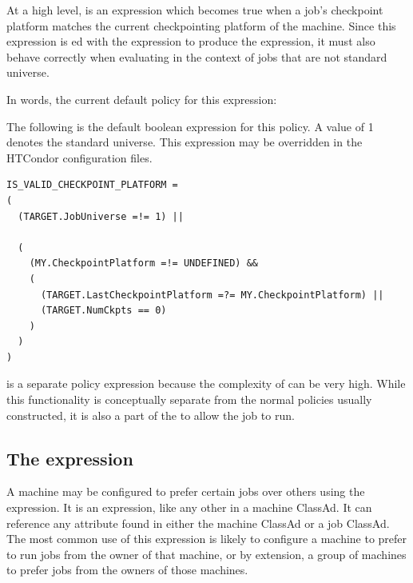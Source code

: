 At a high level,  is an expression
which becomes true when a job's checkpoint platform matches the
current checkpointing platform of the machine. 
Since this expression is ed with the  expression
to produce the  expression,
it must also behave correctly when evaluating in the context of jobs
that are not standard universe.

In words,
the current default policy for this expression:


The following  is the default boolean expression for this
policy.
A  value of 1 denotes the standard universe.
This expression  may be
overridden in the HTCondor configuration files.

\footnotesize
\begin{verbatim}
IS_VALID_CHECKPOINT_PLATFORM = 
(
  (TARGET.JobUniverse =!= 1) ||

  (
    (MY.CheckpointPlatform =!= UNDEFINED) &&
    (
      (TARGET.LastCheckpointPlatform =?= MY.CheckpointPlatform) ||
      (TARGET.NumCkpts == 0)
    )
  )
)
\end{verbatim}
\normalsize

is a separate policy expression because the complexity of
 can be very high.
While this
functionality is conceptually separate from the normal 
policies usually constructed, it is also a part of the 
to allow the job to run.

\subsection{\label{sec:Rank-Expression}
The  expression}

A machine may be configured to prefer certain jobs over others
using the  expression.
It is an
expression, like any other in a machine ClassAd.
It can
reference any attribute found in either the machine ClassAd or a job ClassAd.
The most common use of this expression is likely to configure a
machine to prefer to run jobs from the owner of that machine, or by
extension, a group of machines to prefer jobs from the owners of those
machines.

